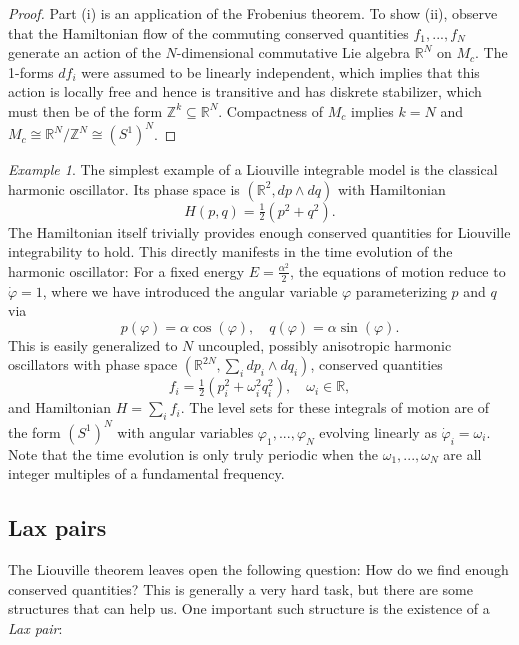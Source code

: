 \documentclass[11pt]{report}
\theoremstyle{definition}
\theoremstyle{remark}
\theoremstyle{remark}
\newtheorem*{example}{Example}
\newcommand{\Z}{\mathbb{Z}}
\newcommand{\R}{\mathbb{R}}
\begin{document}
\begin{proof}
Part (i) is an application of the Frobenius theorem. To show (ii), observe that the Hamiltonian flow of the commuting conserved quantities $f_1,...,f_N$ generate an action of the $N$-dimensional commutative Lie algebra $\R^N$ on $M_c$. The 1-forms $df_i$ were assumed to be linearly independent, which implies that this action is locally free and hence is transitive and has diskrete stabilizer, which must then be of the form $\Z^k \subseteq \R^N$. Compactness of $M_c$ implies $k=N$ and $M_c \cong \R^N / \Z^N \cong (S^1)^N$.
\end{proof}

\begin{example}
The simplest example of a Liouville integrable model is the classical harmonic oscillator. Its phase space is $(\R^2,dp \wedge dq)$ with Hamiltonian
\begin{equation*}
H(p,q) = \tfrac{1}{2} (p^2 + q^2).
\end{equation*}
The Hamiltonian itself trivially provides enough conserved quantities for Liouville integrability to hold. This directly manifests in the time evolution of the harmonic oscillator: For a fixed energy $E = \frac{\alpha^2}{2}$, the equations of motion reduce to $\dot \varphi = 1$, where we have introduced the angular variable $\varphi$ parameterizing $p$ and $q$ via
\begin{equation*}
p(\varphi) = \alpha \cos(\varphi), \quad q(\varphi) = \alpha \sin(\varphi).
\end{equation*}
This is easily generalized to $N$ uncoupled, possibly anisotropic harmonic oscillators with phase space $(\R^{2N},\sum_i dp_i \wedge dq_i)$, conserved quantities
\begin{equation*}
f_i = \tfrac{1}{2}(p_i^2 + \omega_i^2 q_i^2), \quad \omega_i \in \R,
\end{equation*}
and Hamiltonian $H = \sum_i f_i$. The level sets for these integrals of motion are of the form $(S^1)^N$ with angular variables $\varphi_1,...,\varphi_N$ evolving linearly as $\dot \varphi_i = \omega_i$. Note that the time evolution is only truly periodic when the $\omega_1,...,\omega_N$ are all integer multiples of a fundamental frequency.
\end{example}

\subsection{Lax pairs}

The Liouville theorem leaves open the following question: How do we find enough conserved quantities? This is generally a very hard task, but there are some structures that can help us. One important such structure is the existence of a \emph{Lax pair}:
\end{document}

